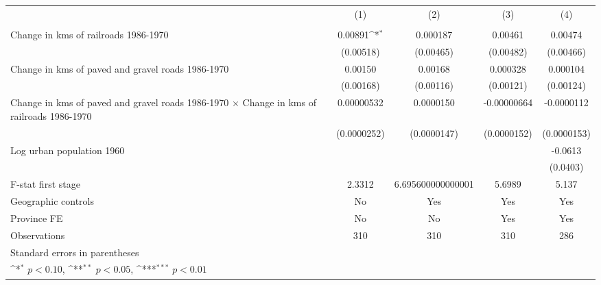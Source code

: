 {
\def\sym#1{\ifmmode^{#1}\else\(^{#1}\)\fi}
\begin{tabular}{l*{4}{c}}
\hline\hline
                &\multicolumn{1}{c}{(1)}&\multicolumn{1}{c}{(2)}&\multicolumn{1}{c}{(3)}&\multicolumn{1}{c}{(4)}\\
                &\multicolumn{1}{c}{}&\multicolumn{1}{c}{}&\multicolumn{1}{c}{}&\multicolumn{1}{c}{}\\
\hline
Change in kms of railroads 1986-1970&  0.00891\sym{*}  & 0.000187         &  0.00461         &  0.00474         \\
                &(0.00518)         &(0.00465)         &(0.00482)         &(0.00466)         \\
[1em]
Change in kms of paved and gravel roads 1986-1970&  0.00150         &  0.00168         & 0.000328         & 0.000104         \\
                &(0.00168)         &(0.00116)         &(0.00121)         &(0.00124)         \\
[1em]
Change in kms of paved and gravel roads 1986-1970 $\times$ Change in kms of railroads 1986-1970&0.00000532         &0.0000150         &-0.00000664         &-0.0000112         \\
                &(0.0000252)         &(0.0000147)         &(0.0000152)         &(0.0000153)         \\
[1em]
Log urban population 1960&                  &                  &                  &  -0.0613         \\
                &                  &                  &                  & (0.0403)         \\
\hline
F-stat first stage&   2.3312         &6.695600000000001         &   5.6989         &    5.137         \\
Geographic controls&       No         &      Yes         &      Yes         &      Yes         \\
Province FE     &       No         &       No         &      Yes         &      Yes         \\
Observations    &      310         &      310         &      310         &      286         \\
\hline\hline
\multicolumn{5}{l}{\footnotesize Standard errors in parentheses}\\
\multicolumn{5}{l}{\footnotesize \sym{*} \(p<0.10\), \sym{**} \(p<0.05\), \sym{***} \(p<0.01\)}\\
\end{tabular}
}

